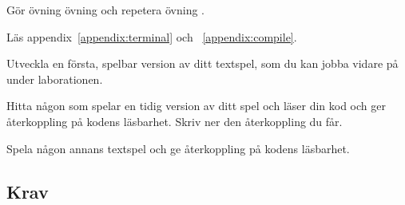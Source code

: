 
\Lab{\LabWeekTHREE}
\begin{Goals}

\end{Goals}

\begin{Preparations}
\item Gör övning övning \texttt{\ExeWeekTHREE} och repetera övning \texttt{\ExeWeekTWO}.
\item Läs appendix~\ref{appendix:terminal} och ~\ref{appendix:compile}.

\item Utveckla en första, spelbar version av ditt textspel, som du kan jobba vidare på under laborationen.
\item Hitta någon som spelar en tidig version av ditt spel och läser din kod och ger återkoppling på kodens läsbarhet. Skriv ner den återkoppling du får.
\item Spela någon annans textspel och ge återkoppling på kodens läsbarhet.
\end{Preparations}


\subsection{Krav}

